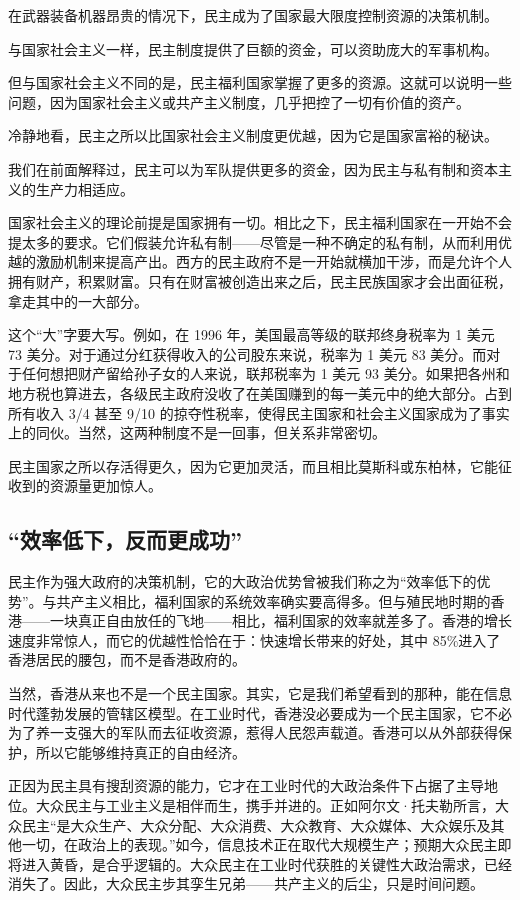 在武器装备机器昂贵的情况下，民主成为了国家最大限度控制资源的决策机制。

与国家社会主义一样，民主制度提供了巨额的资金，可以资助庞大的军事机构。

但与国家社会主义不同的是，民主福利国家掌握了更多的资源。这就可以说明一些问题，因为国家社会主义或共产主义制度，几乎把控了一切有价值的资产。

冷静地看，民主之所以比国家社会主义制度更优越，因为它是国家富裕的秘诀。

我们在前面解释过，民主可以为军队提供更多的资金，因为民主与私有制和资本主义的生产力相适应。

国家社会主义的理论前提是国家拥有一切。相比之下，民主福利国家在一开始不会提太多的要求。它们假装允许私有制——尽管是一种不确定的私有制，从而利用优越的激励机制来提高产出。西方的民主政府不是一开始就横加干涉，而是允许个人拥有财产，积累财富。只有在财富被创造出来之后，民主民族国家才会出面征税，拿走其中的一大部分。

这个“大”字要大写。例如，在 1996 年，美国最高等级的联邦终身税率为 1 美元 73 美分。对于通过分红获得收入的公司股东来说，税率为 1 美元 83 美分。而对于任何想把财产留给孙子女的人来说，联邦税率为 1 美元 93 美分。如果把各州和地方税也算进去，各级民主政府没收了在美国赚到的每一美元中的绝大部分。占到所有收入 3/4 甚至 9/10 的掠夺性税率，使得民主国家和社会主义国家成为了事实上的同伙。当然，这两种制度不是一回事，但关系非常密切。

民主国家之所以存活得更久，因为它更加灵活，而且相比莫斯科或东柏林，它能征收到的资源量更加惊人。

\subsection{“效率低下，反而更成功”}
民主作为强大政府的决策机制，它的大政治优势曾被我们称之为“效率低下的优势”。与共产主义相比，福利国家的系统效率确实要高得多。但与殖民地时期的香港——一块真正自由放任的飞地——相比，福利国家的效率就差多了。香港的增长速度非常惊人，而它的优越性恰恰在于：快速增长带来的好处，其中 85\%进入了香港居民的腰包，而不是香港政府的。

当然，香港从来也不是一个民主国家。其实，它是我们希望看到的那种，能在信息时代蓬勃发展的管辖区模型。在工业时代，香港没必要成为一个民主国家，它不必为了养一支强大的军队而去征收资源，惹得人民怨声载道。香港可以从外部获得保护，所以它能够维持真正的自由经济。

正因为民主具有搜刮资源的能力，它才在工业时代的大政治条件下占据了主导地位。大众民主与工业主义是相伴而生，携手并进的。正如阿尔文·托夫勒所言，大众民主“是大众生产、大众分配、大众消费、大众教育、大众媒体、大众娱乐及其他一切，在政治上的表现。”如今，信息技术正在取代大规模生产；预期大众民主即将进入黄昏，是合乎逻辑的。大众民主在工业时代获胜的关键性大政治需求，已经消失了。因此，大众民主步其孪生兄弟——共产主义的后尘，只是时间问题。

